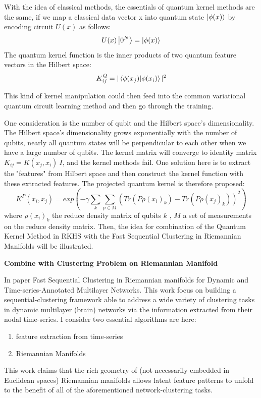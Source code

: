 \documentclass{article}
\begin{document}
With the idea of classical methods, the essentials of 
quantum kernel methods are the same, if we map a 
classical data vector x into quantum state $\ket{\phi(x)}$
by encoding circuit $U(x)$ as follows:
\begin{equation}
  U(x) \ket{0^{N}} = \ket{\phi(x)}
\end{equation}
The quantum kernel function is the inner products of 
two quantum feature vectors in the Hilbert space:
\begin{equation}
  K^Q_{ij} = |\bra{\phi(x_j)} \ket{\phi(x_i) }|^2
\end{equation}

This kind of kernel manipulation could then feed into 
the common variational quantum circuit learning method 
and then go through the training. 

One consideration is the number of 
qubit and the Hilbert space's dimensionality. 
The Hilbert space's dimensionality grows exponentially 
with the number of qubits, nearly all quantum states
will be perpendicular to each other when we have a large 
number of qubits. The kernel matrix will converge 
to identity matrix $K_{ij} = K(x_j,x_i) ~ I$, 
and the kernel methods fail. One solution here is 
to extract the "features" from Hilbert space and 
then construct the kernel function with 
these extracted features. The projected quantum 
kernel is therefore proposed: 
\begin{equation}
  K^P (x_i,x_j) = exp(-\gamma \sum_k \sum_{p \in M} 
  (Tr(P \rho(x_i)_k)-Tr(P \rho(x_j)_k))^2)
\end{equation}
where $\rho(x_i)_k$ the reduce density matrix of 
qubits $k$ , $M$ a set of measurements on 
the reduce density matrix. Then, the idea for combination of 
the Quantum Kernel Method in RKHS with the
Fast Sequential Clustering in Riemannian Manifolds will be 
illustrated.

\textbf{Combine with Clustering Problem on Riemannian Manifold}

In paper Fast Sequential Clustering in Riemannian
manifolds for Dynamic and Time-series-Annotated Multilayer Networks. This
work focus on building a sequential-clustering framework able to address
a wide variety of clustering tasks in dynamic multilayer (brain) networks
via the information extracted from their nodal time-series.
I consider two essential algorithms are here:
\begin{enumerate}
  \item feature extraction from time-series
  \item Riemannian Manifolds
\end{enumerate}
This work claims that the rich geometry of 
(not necessarily embedded in Euclidean spaces) Riemannian manifolds 
allows latent feature patterns to unfold to the benefit of all of 
the aforementioned network-clustering tasks.
\end{document}
